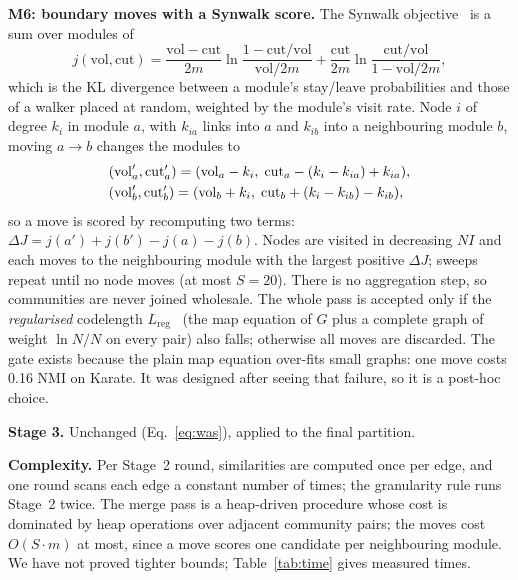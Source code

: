 \documentclass[conference]{IEEEtran}
\begin{document}
\textbf{M6: boundary moves with a Synwalk score.} The Synwalk objective~\cite{toth2022} is a sum over modules of
\begin{equation}
j(\mathrm{vol},\mathrm{cut})=\frac{\mathrm{vol}-\mathrm{cut}}{2m}\ln\frac{1-\mathrm{cut}/\mathrm{vol}}{\mathrm{vol}/2m}+\frac{\mathrm{cut}}{2m}\ln\frac{\mathrm{cut}/\mathrm{vol}}{1-\mathrm{vol}/2m},\label{eq:synwalk}
\end{equation}
which is the KL divergence between a module's stay/leave probabilities and those of a walker placed at random, weighted by the module's visit rate. Node $i$ of degree $k_i$ in module $a$, with $k_{ia}$ links into $a$ and $k_{ib}$ into a neighbouring module $b$, moving $a\to b$ changes the modules to
\begin{align}
&(\mathrm{vol}_a',\mathrm{cut}_a')=(\mathrm{vol}_a-k_i,\;\mathrm{cut}_a-(k_i-k_{ia})+k_{ia}),\notag\\
&(\mathrm{vol}_b',\mathrm{cut}_b')=(\mathrm{vol}_b+k_i,\;\mathrm{cut}_b+(k_i-k_{ib})-k_{ib}),\label{eq:move}
\end{align}
so a move is scored by recomputing two terms: $\Delta J=j(a')+j(b')-j(a)-j(b)$. Nodes are visited in decreasing $NI$ and each moves to the neighbouring module with the largest positive $\Delta J$; sweeps repeat until no node moves (at most $S=20$). There is no aggregation step, so communities are never joined wholesale. The whole pass is accepted only if the \emph{regularised} codelength $L_{\mathrm{reg}}$~\cite{smiljanic2020} (the map equation of $G$ plus a complete graph of weight $\ln N/N$ on every pair) also falls; otherwise all moves are discarded. The gate exists because the plain map equation over-fits small graphs: one move costs 0.16 NMI on Karate. It was designed after seeing that failure, so it is a post-hoc choice.

\textbf{Stage 3.} Unchanged (Eq.~\eqref{eq:was}), applied to the final partition.

\textbf{Complexity.} Per Stage~2 round, similarities are computed once per edge, and one round scans each edge a constant number of times; the granularity rule runs Stage~2 twice. The merge pass is a heap-driven procedure whose cost is dominated by heap operations over adjacent community pairs; the moves cost $O(S\cdot m)$ at most, since a move scores one candidate per neighbouring module. We have not proved tighter bounds; Table~\ref{tab:time} gives measured times.
\end{document}
